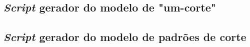 \documentclass[12pt, a4paper, titlepage]{article}
\begin{document}
\begin{landscape}

    \subsection{\emph{Script} gerador do modelo de "um-corte"{}}
\label{code:one-cut}

\pagebreak

\subsection{\emph{Script} gerador do modelo de padrões de corte}
\label{code:cutting-patterns}


\end{landscape}
\end{document}
